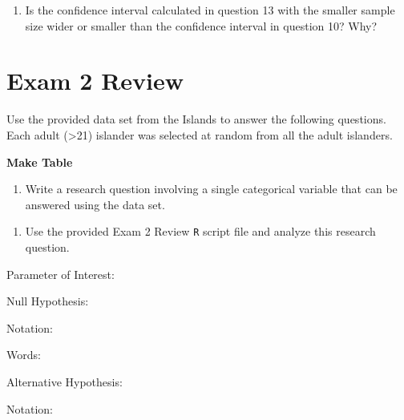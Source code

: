 \documentclass[
]{report}
\providecommand{\tightlist}{%
  \setlength{\itemsep}{0pt}\setlength{\parskip}{0pt}}
\newcommand{\rgi}{\hspace{24pt}}  %
\begin{document}
\vspace{.8in}

\begin{enumerate}
\def\labelenumi{\arabic{enumi}.}
\setcounter{enumi}{14}
\tightlist
\item
  Is the confidence interval calculated in question 13 with the smaller sample size wider or smaller than the confidence interval in question 10? Why?
\end{enumerate}

\hypertarget{exam-2-review}{%
\chapter{Exam 2 Review}\label{exam-2-review}}

Use the provided data set from the Islands to answer the following questions. Each adult (\textgreater21) islander was selected at random from all the adult islanders.

\textbf{Make Table}

\begin{enumerate}
\def\labelenumi{\arabic{enumi}.}
\tightlist
\item
  Write a research question involving a single categorical variable that can be answered using the data set.
\end{enumerate}

\vspace{0.8in}

\begin{enumerate}
\def\labelenumi{\arabic{enumi}.}
\setcounter{enumi}{1}
\tightlist
\item
  Use the provided Exam 2 Review \texttt{R} script file and analyze this research question.
\end{enumerate}

\rgi Parameter of Interest:

\vspace{0.3in}

\rgi Null Hypothesis:

\rgi \rgi Notation:

\vspace{0.3in}

\rgi \rgi Words:

\vspace{0.5in}

\rgi Alternative Hypothesis:

\rgi \rgi Notation:

\vspace{0.3in}
\end{document}
